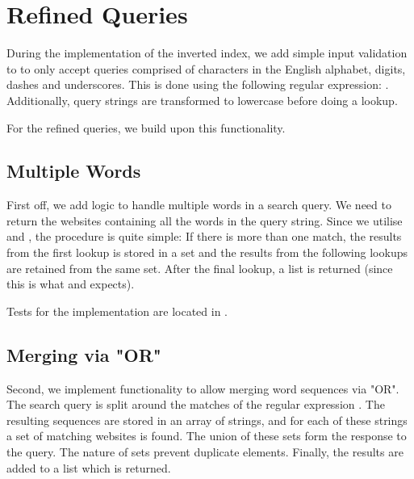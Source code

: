 \section{Refined Queries}

During the implementation of the inverted index, we add simple input validation to  to only accept queries comprised of characters in the English alphabet, digits, dashes and underscores. This is done using the following regular expression: \code{\\\\b([-\\\\w]+)\\\\b}. Additionally, query strings are transformed to lowercase before doing a lookup.

For the refined queries, we build upon this functionality.

\subsection{Multiple Words}
First off, we add logic to handle multiple words in a search query. We need to return the websites containing all the words in the query string. Since we utilise  and , the procedure is quite simple: If there is more than one match, the results from the first lookup is stored in a set and the results from the following lookups are retained from the same set. After the final lookup, a list is returned (since this is what  and  expects).

Tests for the implementation are located in .

\subsection{Merging via "OR"}
Second, we implement functionality to allow merging word sequences via "OR". The search query is split around the matches of the regular expression \code{\\\\bOR\\\\b}. The resulting sequences are stored in an array of strings, and for each of these strings a set of matching websites is found. The union of these sets form the response to the query. The nature of sets prevent duplicate elements. Finally, the results are added to a list which is returned.


